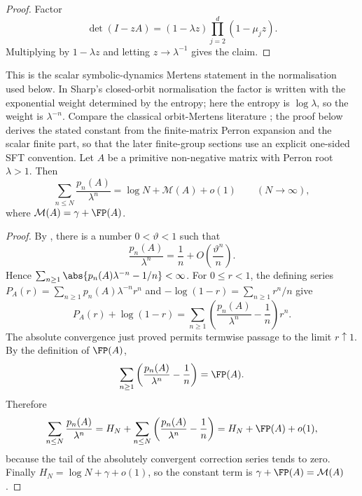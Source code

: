 \begin{proof}
  Factor
  \[
    \det(I-zA)
    =(1-\lambda z)\prod_{j=2}^d(1-\mu_j z).
  \]
  Multiplying by \(1-\lambda z\) and letting \(z\to\lambda^{-1}\) gives
  the claim.
\end{proof}

\begin{corollary}
  \label{cor:finite-part-mertens-asymptotic}
  \leavevmode\par\noindent
  This is the scalar symbolic-dynamics Mertens statement in the normalisation
  used below.  In Sharp's closed-orbit normalisation the factor is written
  with the exponential weight determined by the entropy; here the entropy is
  \(\log\lambda\), so the weight is \(\lambda^{-n}\).  Compare the classical
  orbit-Mertens literature
  \cite{Sharp1991Mertens,ParryPollicott1990Zeta}; the proof below derives the
  stated constant from the finite-matrix Perron expansion and the scalar
  finite part, so that the later finite-group sections use an explicit
  one-sided SFT convention.
  Let \(A\) be a primitive non-negative matrix with Perron root
  \(\lambda>1\). Then
  \[
    \sum_{n\le N}\frac{p_n(A)}{\lambda^n}
    =\log N+\mathcal M(A)+o(1)
    \qquad (N\to\infty),
  \]
  where \(\mathcal M(A)=\gamma+\FP(A)\).
\end{corollary}

\begin{proof}
  By , there is a number
  \(0<\vartheta<1\) such that
  \[
    \frac{p_n(A)}{\lambda^n}
    =
    \frac{1}{n}+O\!\left(\frac{\vartheta^n}{n}\right).
  \]
  Hence
  \(\sum_{n\ge1}\abs{p_n(A)\lambda^{-n}-1/n}<\infty\). For
  \(0\le r<1\), the defining series
  \(P_A(r)=\sum_{n\ge1}p_n(A)\lambda^{-n}r^n\) and
  \(-\log(1-r)=\sum_{n\ge1}r^n/n\) give
  \[
    P_A(r)+\log(1-r)
    =
    \sum_{n\ge1}\left(\frac{p_n(A)}{\lambda^n}-\frac1n\right)r^n .
  \]
  The absolute convergence just proved permits termwise passage to the
  limit \(r\uparrow1\). By the definition of \(\FP(A)\),
  \[
    \sum_{n\ge1}\left(\frac{p_n(A)}{\lambda^n}-\frac1n\right)
    =\FP(A).
  \]
  Therefore
  \[
    \sum_{n\le N}\frac{p_n(A)}{\lambda^n}
    =H_N+
      \sum_{n\le N}\left(\frac{p_n(A)}{\lambda^n}-\frac1n\right)
    =H_N+\FP(A)+o(1),
  \]
  because the tail of the absolutely convergent correction series tends to
  zero. Finally \(H_N=\log N+\gamma+o(1)\), so the constant term is
  \(\gamma+\FP(A)=\mathcal M(A)\).
\end{proof}

